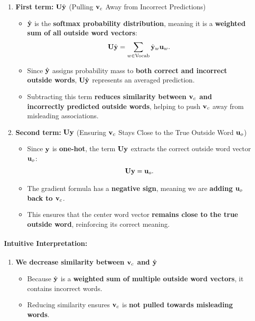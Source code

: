 \begin{parts}
{\begin{enumerate}[label=\roman*.]
{    \begin{enumerate}
        \item \textbf{First term:} $\mathbf{U} \hat{\mathbf{y}}$ (Pulling $\mathbf{v}_c$ Away from Incorrect Predictions)
        \begin{itemize}
            \item $\hat{\mathbf{y}}$ is the \textbf{softmax probability distribution}, meaning it is a \textbf{weighted sum of all outside word vectors}:
            \[
            \mathbf{U} \hat{\mathbf{y}} = \sum_{w \in \text{Vocab}} \hat{\mathbf{y}}_w \mathbf{u}_w.
            \]
            \item Since $\hat{\mathbf{y}}$ assigns probability mass to \textbf{both correct and incorrect outside words}, $\mathbf{U} \hat{\mathbf{y}}$ represents an averaged prediction.
            \item Subtracting this term \textbf{reduces similarity between $\mathbf{v}_c$ and incorrectly predicted outside words}, helping to push $\mathbf{v}_c$ away from misleading associations.
        \end{itemize}

        \item \textbf{Second term:} $\mathbf{U} \mathbf{y}$ (Ensuring $\mathbf{v}_c$ Stays Close to the True Outside Word $\mathbf{u}_o$)
        \begin{itemize}
            \item Since $\mathbf{y}$ is \textbf{one-hot}, the term $\mathbf{U} \mathbf{y}$ extracts the correct outside word vector $\mathbf{u}_o$:
            \[
            \mathbf{U} \mathbf{y} = \mathbf{u}_o.
            \]
            \item The gradient formula has a \textbf{negative sign}, meaning we are \textbf{adding $\mathbf{u}_o$ back to $\mathbf{v}_c$}.
            \item This ensures that the center word vector \textbf{remains close to the true outside word}, reinforcing its correct meaning.
        \end{itemize}
    \end{enumerate}

    \paragraph{Intuitive Interpretation:}
    \begin{enumerate}
        \item \textbf{We decrease similarity between $\mathbf{v}_c$ and $\hat{\mathbf{y}}$}
        \begin{itemize}
            \item Because $\hat{\mathbf{y}}$ is a \textbf{weighted sum of multiple outside word vectors}, it contains incorrect words.
            \item Reducing similarity ensures $\mathbf{v}_c$ is \textbf{not pulled towards misleading words}.
        \end{itemize}


\end{enumerate}}
\end{enumerate}}
\end{parts}
